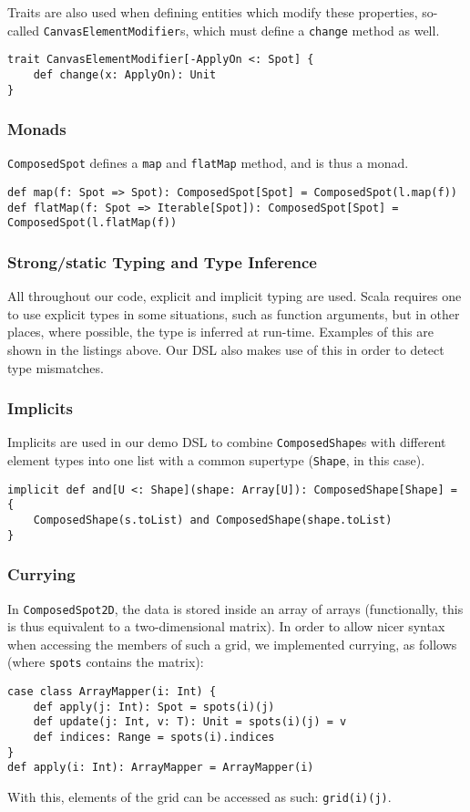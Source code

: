 \documentclass[journal,onecolumn]{IEEEtran}
\theoremstyle{definition}
\newcommand{\scala}[1]{\texttt{#1}}
\begin{document}
Traits are also used when defining entities which modify these properties, so-called \scala{CanvasElementModifier}s, which must define a \scala{change} method as well.
\begin{verbatim}
trait CanvasElementModifier[-ApplyOn <: Spot] {
	def change(x: ApplyOn): Unit
}
\end{verbatim}

\subsubsection{Monads}
\scala{ComposedSpot} defines a \scala{map} and \scala{flatMap} method, and is thus a monad.
\begin{verbatim}
def map(f: Spot => Spot): ComposedSpot[Spot] = ComposedSpot(l.map(f))
def flatMap(f: Spot => Iterable[Spot]): ComposedSpot[Spot] = ComposedSpot(l.flatMap(f))
\end{verbatim}

\subsubsection{Strong/static Typing and Type Inference}
All throughout our code, explicit and implicit typing are used.
Scala requires one to use explicit types in some situations, such as function arguments, but in other places, where possible, the type is inferred at run-time.
Examples of this are shown in the listings above.
Our DSL also makes use of this in order to detect type mismatches.

\subsubsection{Implicits}
Implicits are used in our demo DSL to combine \scala{ComposedShape}s with different element types into one list with a common supertype (\scala{Shape}, in this case).
\begin{verbatim}
implicit def and[U <: Shape](shape: Array[U]): ComposedShape[Shape] = {
	ComposedShape(s.toList) and ComposedShape(shape.toList)
}
\end{verbatim}

\subsubsection{Currying}
In \scala{ComposedSpot2D}, the data is stored inside an array of arrays (functionally, this is thus equivalent to a two-dimensional matrix).
In order to allow nicer syntax when accessing the members of such a grid, we implemented currying, as follows (where \scala{spots} contains the matrix):
\begin{verbatim}
case class ArrayMapper(i: Int) {
	def apply(j: Int): Spot = spots(i)(j)
	def update(j: Int, v: T): Unit = spots(i)(j) = v
	def indices: Range = spots(i).indices
}
def apply(i: Int): ArrayMapper = ArrayMapper(i)
\end{verbatim}
With this, elements of the grid can be accessed as such: \scala{grid(i)(j)}.
\end{document}
